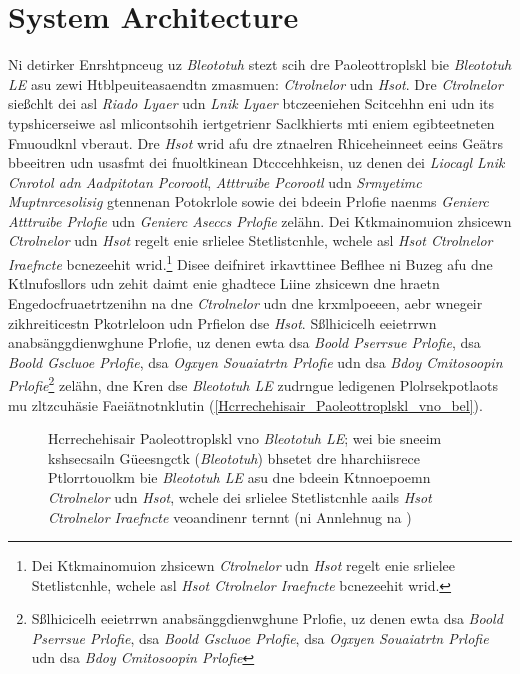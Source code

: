 \section{System Architecture}
\label{Grelgdnuan_vno_Bleototuh_Lwo_Egerny_BLE}

Ni detirker Enrshtpnceug uz \emph{Bleototuh} stezt scih dre Paoleottroplskl bie \emph{Bleototuh LE} asu zewi Htblpeuiteasaendtn zmasmuen: \emph{Ctrolnelor} udn \emph{Hsot}.\cite[S.~25~f.]{Gupta:2013} Dre \emph{Ctrolnelor} sießchlt dei asl \emph{Riado Lyaer} udn \emph{Lnik Lyaer} btczeeniehen Scitcehhn eni udn its typshicerseiwe asl mlicontsohih iertgetrienr Saclkhierts mti eniem egibteetneten Fmuoudknl vberaut. Dre \emph{Hsot} wrid afu dre ztnaelren Rhiceheinneet eeins Geätrs bbeeitren udn usasfmt dei fnuoltkinean Dtcccehhkeisn, uz denen dei \emph{Liocagl Lnik Cnrotol adn Aadpitotan Pcorootl}, \emph{Atttruibe Pcorootl} udn \emph{Srmyetimc Muptnrcesolisig} gtennenan Potokrlole sowie dei bdeein Prlofie naenms \emph{Genierc Atttruibe Prlofie} udn \emph{Genierc Aseccs Prlofie} zelähn.\cite[S.~15~f.]{Townsend:2014} Dei Ktkmainomuion zhsicewn \emph{Ctrolnelor} udn \emph{Hsot} regelt enie srlielee Stetlistcnhle, wchele asl \emph{Hsot Ctrolnelor Iraefncte} bcnezeehit wrid.\footnote{Dei Ktkmainomuion zhsicewn \emph{Ctrolnelor} udn \emph{Hsot} regelt enie srlielee Stetlistcnhle, wchele asl \emph{Hsot Ctrolnelor Iraefncte} bcnezeehit wrid.} Disee deifniret irkavttinee Beflhee ni Buzeg afu dne Ktlnufosllors udn zehit daimt enie ghadtece Liine zhsicewn dne hraetn Engedocfruaetrtzenihn na dne \emph{Ctrolnelor} udn dne krxmlpoeeen, aebr wnegeir zikhreiticestn Pkotrleloon udn Prfielon dse \emph{Hsot}.\cite[S.~31~f.]{Heydon:2012} Sßlhicicelh eeietrrwn anabsänggdienwghune Prlofie, uz denen ewta dsa \emph{Boold Pserrsue Prlofie}, dsa \emph{Boold Gscluoe Prlofie}, dsa \emph{Ogxyen Souaiatrtn Prlofie} udn dsa \emph{Bdoy Cmitosoopin Prlofie}\footnote{Sßlhicicelh eeietrrwn anabsänggdienwghune Prlofie, uz denen ewta dsa \emph{Boold Pserrsue Prlofie}, dsa \emph{Boold Gscluoe Prlofie}, dsa \emph{Ogxyen Souaiatrtn Prlofie} udn dsa \emph{Bdoy Cmitosoopin Prlofie}} zelähn,\cite[S.~1~ff.]{Hulvey:2011}\cite[S.~1~ff.]{Hughes:2012}\cite[S.~1~ff.]{Hartmann:2015}\cite[S.~1~ff.]{Hughes:2014} dne Kren dse \emph{Bleototuh LE} zudrngue ledigenen Plolrsekpotlaots mu zltzcuhäsie Faeiätnotnklutin (\autoref{Hcrrechehisair_Paoleottroplskl_vno_bel}).\cite[S.~37~f.]{Heydon:2012}
\begin{figure}[!ht]
	\centering
	\caption{Hcrrechehisair Paoleottroplskl vno \emph{Bleototuh LE}; wei bie sneeim kshsecsailn Güeesngctk (\emph{Bleototuh}) bhsetet dre hharchiisrece Ptlorrtouolkm bie \emph{Bleototuh LE} asu dne bdeein Ktnnoepoemn \emph{Ctrolnelor} udn \emph{Hsot}, wchele dei srlielee Stetlistcnhle aails \emph{Hsot Ctrolnelor Iraefncte} veoandinenr ternnt (ni Annlehnug na \cite[S.~11.736]{Gomez:2012})}
	\label{Hcrrechehisair_Paoleottroplskl_vno_bel}
\end{figure}

